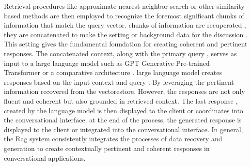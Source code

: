 \vskip 0.5cm
Retrieval procedures like approximate nearest neighbor search or other similarity based methods are then employed to recognize the foremost significant chunks of information that match the query vector. chunks of information are recuperated , they are concatenated to make the setting or background data for the discussion . This setting gives the fundamental foundation for creating coherent and pertinent responses.
\vskip 0.5cm
The concatenated context, along with the primary query , serves as input to a large language model such as GPT Generative Pre-trained Transformer or a comparative architecture .
\vskip 0.5cm
large language model creates responses based on the input context and query . By leveraging the pertinent information recovered from the vectorestore. However, the responses are not only fluent and coherent but also grounded in retrieved context.
\vskip 0.5cm
The last response , created by the language model is then displayed to the client or coordinates into the conversational interface.
\vskip 0.5cm
at the end of the process, the generated response is displayed to the client or integrated into the conversational interface. In general, the Rag system consistently integrates the processes of data recovery and generation to create contextually pertinent and coherent responses in conversational applications.
